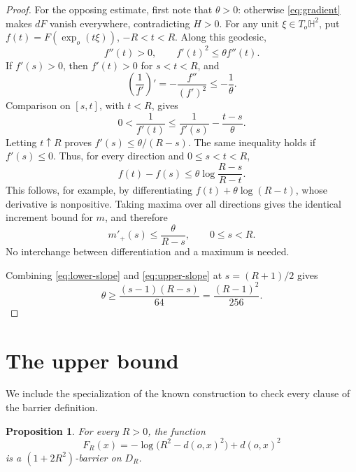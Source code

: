 \documentclass[11pt]{article}
\newtheorem{proposition}[theorem]{Proposition}
\newcommand{\HH}{\mathbb H}
\begin{document}
\begin{proof}
For the opposing estimate, first note that \(\theta>0\): otherwise
\eqref{eq:gradient} makes \(dF\) vanish everywhere, contradicting \(H>0\).
For any unit \(\xi\in T_o\HH^2\), put
\(f(t)=F(\exp_o(t\xi))\), \(-R<t<R\). Along this geodesic,
\[
 f''(t)>0,\qquad f'(t)^2\leq\theta f''(t).
\]
If \(f'(s)>0\), then \(f'(t)>0\) for \(s<t<R\), and
\[
 \left(\frac1{f'}\right)'=-\frac{f''}{(f')^2}\leq-\frac1\theta.
\]
Comparison on \([s,t]\), with \(t<R\), gives
\[
 0<\frac1{f'(t)}
   \leq\frac1{f'(s)}-\frac{t-s}{\theta}.
\]
Letting \(t\uparrow R\) proves \(f'(s)\leq\theta/(R-s)\). The same
inequality holds if \(f'(s)\leq0\). Thus, for every direction and
\(0\leq s<t<R\),
\[
 f(t)-f(s)\leq\theta\log\frac{R-s}{R-t}.
\]
This follows, for example, by differentiating
\(f(t)+\theta\log(R-t)\), whose derivative is nonpositive. Taking
maxima over all directions gives the identical increment bound for
\(m\), and therefore
\begin{equation}
 m'_+(s)\leq\frac{\theta}{R-s},\qquad 0\leq s<R.\label{eq:upper-slope}
\end{equation}
No interchange between differentiation and a maximum is needed.

Combining \eqref{eq:lower-slope} and \eqref{eq:upper-slope} at
\(s=(R+1)/2\) gives
\[
 \theta\geq\frac{(s-1)(R-s)}{64}=\frac{(R-1)^2}{256}.
\]
\end{proof}

\section{The upper bound}

We include the specialization of the known construction to check every
clause of the barrier definition.

\begin{proposition}\label{prop:upper}
For every \(R>0\), the function
\[
 F_R(x)=-\log\bigl(R^2-d(o,x)^2\bigr)+d(o,x)^2
\]
is a \((1+2R^2)\)-barrier on \(D_R\).
\end{proposition}
\end{document}
